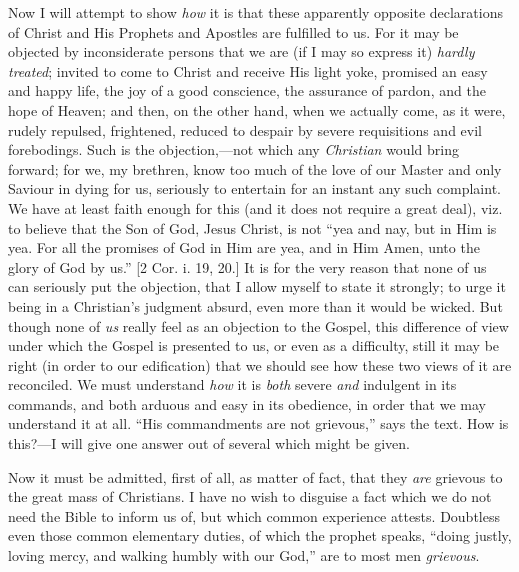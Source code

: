 Now I will attempt to show \emph{how} it is that these
apparently opposite declarations of Christ and His
Prophets and Apostles are fulfilled to us. For it may be
objected by inconsiderate persons that we are (if I may
so express it) \emph{hardly treated}; invited to come to
Christ and receive His light yoke, promised an easy and
happy life, the joy of a good conscience, the assurance
of pardon, and the hope of Heaven; and then, on the other
hand, when we actually come, as it were, rudely repulsed,
frightened, reduced to despair by severe requisitions and
evil forebodings. Such is the objection,—not which
any \emph{Christian} would bring forward; for we, my
brethren, know too much of the love of our Master and
only Saviour in dying for us, seriously to entertain for
an instant any such complaint. We have at least faith
enough for this (and it does not require a great deal),
viz. to believe that the Son of God, Jesus Christ, is not
``yea and nay, but in Him is yea. For all the
promises of God in Him are yea, and in Him Amen, unto the
glory of God by us.'' [2 Cor. i. 19, 20.] It is for
the very reason that none of us can seriously put the
objection, that I allow myself to state it strongly; to
urge it being in a Christian's judgment absurd, even more
than it would be wicked. But though none of \emph{us} really
feel as an objection to the Gospel, this difference of
view under which the Gospel is presented to us, or even
as a difficulty, still it may be right (in order to our
edification) that we should see how these two views of it
are reconciled. We must understand \emph{how} it is \emph{both}
severe \emph{and} indulgent in its commands, and both
arduous and easy in its obedience, in order that we may
understand it at all. ``His commandments are not
grievous,'' says the text. How is this?—I will
give one answer out of several which might be given.

Now it must be admitted, first of all, as matter of
fact, that they \emph{are} grievous to the great mass of
Christians. I have no wish to disguise a fact which we do
not need the Bible to inform us of, but which common
experience attests. Doubtless even those common
elementary duties, of which the prophet speaks,
``doing justly, loving mercy, and walking humbly with
our God,'' are to most men \emph{grievous}.

